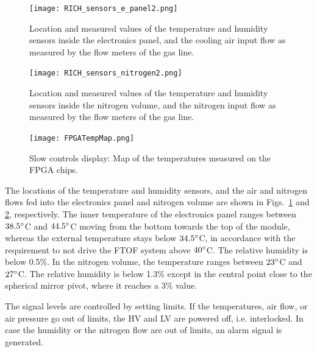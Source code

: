 \documentclass[5p,times,twocolumn]{elsarticle}
\begin{document}
\begin{figure}[t]
\begin{center}
\texttt{[image: RICH\_sensors\_e\_panel2.png]}
\end{center}
\caption{Location and measured values of the temperature and humidity sensors inside the electronics panel, and the cooling air input flow as measured by the flow meters of the gas line.}
\label{Fig:RICH_sensors_e_panel}
\end{figure}

\begin{figure}[t]
\begin{center}
\texttt{[image: RICH\_sensors\_nitrogen2.png]}
\end{center}
\caption{Location and measured values of the temperature and humidity sensors inside the nitrogen volume, and the nitrogen input flow as measured by the flow meters of the gas line.}
\label{Fig:RICH_sensors_nitrogen}
\end{figure}

\begin{figure}[t]
\begin{center}
\texttt{[image: FPGATempMap.png]}
\end{center}
\caption{Slow controls display: Map of the temperatures measured on the FPGA chips.}
\label{fig:Online_FPGATempMap}
\end{figure}

The locations of the temperature and humidity sensors, and the air and nitrogen flows fed into the electronics panel and nitrogen volume are shown in Figs.~\ref{Fig:RICH_sensors_e_panel} and \ref{Fig:RICH_sensors_nitrogen},
respectively. The inner temperature of the electronics panel ranges between $\rm 38.5^\circ$C and $\rm 44.5^\circ$C
moving from the bottom towards the top of the module, whereas the external temperature stays below $\rm 34.5^\circ$C,
in accordance with the requirement to not drive the FTOF system above $\rm 40^\circ$C. The relative humidity is below
0.5\%. In the nitrogen volume, the temperature ranges between $\rm 23^\circ$C and $\rm 27^\circ$C. The relative
humidity is below 1.3\% except in the central point close to the spherical mirror pivot, where it reaches a 3\% value.

The signal levels are controlled by setting limits.  If the temperatures, air flow, or air pressure go out of limits, the
HV and LV are powered off, i.e. interlocked. In case the humidity or the nitrogen flow are out of limits, an alarm signal
is generated.
\end{document}
